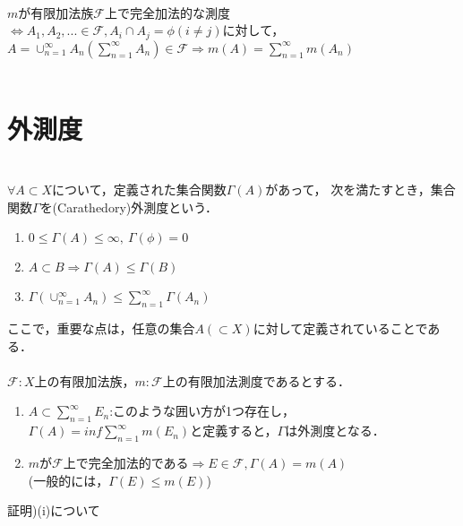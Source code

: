 \documentclass[11pt, a4paper, dvipdfmx]{jsarticle}
\theoremstyle{definition}
\newcommand{\F}{\mathcal{F}}
\begin{document}
\\
$m$が有限加法族$\mathcal{F}$上で完全加法的な測度\\
$\Leftrightarrow A_1,A_2,... \in \mathcal{F},A_i \cap A_j = \phi(i \neq j)$に対して，\\
$A = \cup_{n=1}^{\infty}A_n(\sum^{\infty}_{n=1}A_n) \in \mathcal{F} \Rightarrow m(A) = \sum_{n=1}^{\infty}m(A_n)$\\
\\
\section{外測度}
\\
$\forall A \subset X$について，定義された集合関数$\Gamma(A)$があって，
次を満たすとき，集合関数$\Gamma$を(Carathedory)外測度という．
\begin{enumerate}
  \renewcommand{\labelenumi}{(\roman{enumi})}

  \item $0 \le \Gamma(A) \le \infty,~ \Gamma(\phi) = 0$\\

  \item $A \subset B \Rightarrow \Gamma(A) \le \Gamma(B)$\\

  \item $\Gamma(\cup_{n=1}^{\infty}A_n) \le \sum_{n=1}^{\infty} \Gamma(A_n)$

\end{enumerate}
ここで，重要な点は，任意の集合$A (\subset X)$に対して定義されていることである．\\
\\
\Theorem $\F:X$上の有限加法族，$m:\F$上の有限加法測度であるとする．
\begin{enumerate}
  \renewcommand{\labelenumi}{(\roman{enumi})}
  \item $A \subset \sum_{n=1}^{\infty}E_n$:このような囲い方が1つ存在し，\\
  $\Gamma(A) = inf \sum_{n=1}^{\infty}m(E_n)$と定義すると，$\Gamma$は外測度となる．
  \\
  \item $m$が$\F$上で完全加法的である$\Rightarrow E \in \F ,\Gamma(A) = m(A)$\\
  (一般的には，$\Gamma(E) \le m(E)$)
\end{enumerate}
証明)(i)について
\end{document}
